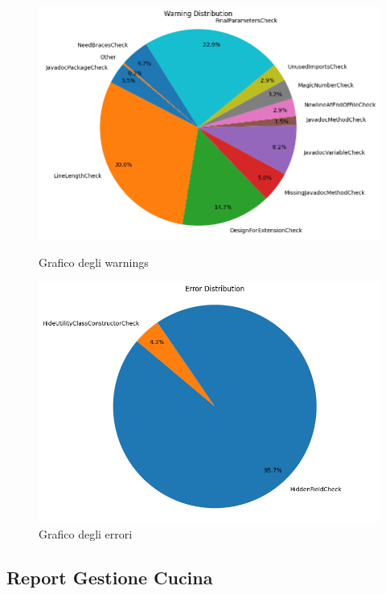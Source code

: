 \begin{figure}[H]
\begin{minipage}[b]{0.45\textwidth}
		\includegraphics[width=\textwidth]{iterazione1/images/cliente-warning_severity_distribution_pie_chart.png}
		\caption{Grafico degli warnings}
		\label{fig:cliente-warning_severity_distribution_pie_chart}
	\end{minipage}
	\hfill
	\begin{minipage}[b]{0.45\textwidth}
		\centering
		\includegraphics[width=\textwidth]{iterazione1/images/cliente-error_severity_distribution_pie_chart.png}
		\caption{Grafico degli errori}
		\label{fig:cliente-error_severity_distribution_pie_chart}
	\end{minipage}
\end{figure}

\newpage

\subsection{Report Gestione Cucina}

